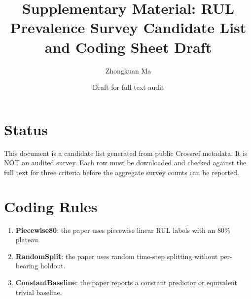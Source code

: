 \documentclass[10pt]{article}
\title{Supplementary Material: RUL Prevalence Survey Candidate List and Coding Sheet Draft}
\author{Zhongkuan Ma}
\date{Draft for full-text audit}
\begin{document}
\maketitle
\section*{Status}
This document is a candidate list generated from public Crossref metadata. It is NOT an audited survey. Each row must be downloaded and checked against the full text for three criteria before the aggregate survey counts can be reported.
\section*{Coding Rules}
\begin{enumerate}
\item \textbf{Piecewise80}: the paper uses piecewise linear RUL labels with an 80\% plateau.
\item \textbf{RandomSplit}: the paper uses random time-step splitting without per-bearing holdout.
\item \textbf{ConstantBaseline}: the paper reports a constant predictor or equivalent trivial baseline.
\end{enumerate}
\end{document}
